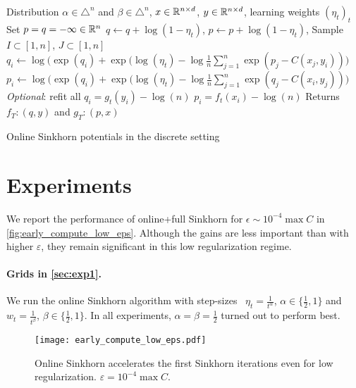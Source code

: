 \begin{algorithm}[t]
    \begin{algorithmic}
    \Input Distribution $\alpha \in \triangle^n$ and 
    $\beta \in \triangle^n$, $x \in \mathbb{R}^{n \times d}$, 
    $y \in \mathbb{R}^{n \times d}$, learning weights ${(\eta_t)}_t$
    \State Set $p = q = - \infty \in \mathbb{R}^n$
        \State $q \gets q + \log(1 - \eta_t)$, $p \gets p + \log(1 - \eta_t)$,
        \State Sample $I \subset [1, n]$, $J \subset [1, n]$
            \State $q_i \gets \log \big( \exp(q_i)
            + \exp(\log(\eta_t) - \log \frac{1}{n} 
            \sum_{j=1}^{n} \exp(p_j - C(x_j, y_i)) \big) $
        \EndFor
        \State $p_i \gets \log \big( \exp(q_i)
        + \exp(\log(\eta_t) - \log \frac{1}{n} 
        \sum_{j=1}^{n} \exp(q_j - C(x_i, y_j)) \big)$
        \EndFor
        \State \textit{Optional}: refit all $q_i = g_t(y_i) - \log (n)$
        \State\hspace{2.45cm} $p_i = f_t(x_i) - \log (n)$
    \EndFor
    \State Returns $f_T : (q, y)$ and
    $g_T : (p, x)$
    \end{algorithmic}
    \caption{Online Sinkhorn potentials in the discrete setting}\label{alg:discrete_online}
\end{algorithm}



\section{Experiments}\label{sec:supp_exp}

We report the performance of online+full Sinkhorn for $\epsilon \sim 10^{-4}
\max C$ in \autoref{fig:early_compute_low_eps}. Although the gains are less
important than with higher $\varepsilon$, they remain significant in this low
regularization regime.

\paragraph{Grids in \autoref{sec:exp1}.} We run the online Sinkhorn algorithm
with step-sizes  $\eta_t = \frac{1}{t^\alpha}$, $\alpha \in \{ \frac{1}{2}, 1 \}$
and $w_t = \frac{1}{{t^\beta}}$, $\beta \in \{ \frac{1}{2}, 1 \}$. In all
experiments, $\alpha = \beta = \frac{1}{2}$ turned out to perform best.

\begin{figure}[ht]
    \centering
    \texttt{[image: early\_compute\_low\_eps.pdf]}
    \caption{Online Sinkhorn accelerates the first Sinkhorn iterations even for low regularization. $\varepsilon = 10^{-4} \max C$.}
    \label{fig:early_compute_low_eps}
\end{figure}
